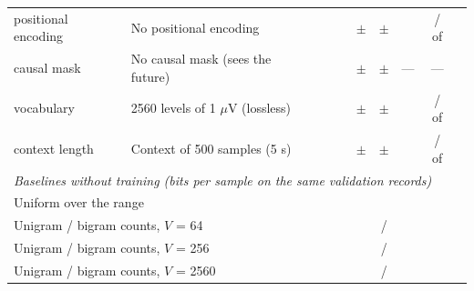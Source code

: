 \begin{tabular}{llrrrccccr}
\addlinespace
positional encoding & No positional encoding & \generativeParamsNoPos{} & \generativeContextNoPos{} & \generativeVocabNoPos{} & \generativeCeMeanNoPos{} $\pm$ \generativeCeSdNoPos{} & \generativeBitsMeanNoPos{} $\pm$ \generativeBitsSdNoPos{} & \generativeDiffMeanNoPos{} & \generativeNSeedsBetterNoPos{} / \generativeNSeedsWorseNoPos{} of \generativeNSeedsComparedNoPos{} & \generativeCeLastMeanNoPos{} \\
\addlinespace
causal mask & No causal mask (sees the future) & \generativeParamsNoMask{} & \generativeContextNoMask{} & \generativeVocabNoMask{} & \generativeCeMeanNoMask{} $\pm$ \generativeCeSdNoMask{} & \generativeBitsMeanNoMask{} $\pm$ \generativeBitsSdNoMask{} & --- & --- & \generativeCeLastMeanNoMask{} \\
\addlinespace
vocabulary & 2560 levels of 1 $\mu$V (lossless) & \generativeParamsVocabTwoFiveSixZero{} & \generativeContextVocabTwoFiveSixZero{} & \generativeVocabVocabTwoFiveSixZero{} & \generativeCeMeanVocabTwoFiveSixZero{} $\pm$ \generativeCeSdVocabTwoFiveSixZero{} & \generativeBitsMeanVocabTwoFiveSixZero{} $\pm$ \generativeBitsSdVocabTwoFiveSixZero{} & \generativeDiffMeanVocabTwoFiveSixZero{} & \generativeNSeedsBetterVocabTwoFiveSixZero{} / \generativeNSeedsWorseVocabTwoFiveSixZero{} of \generativeNSeedsComparedVocabTwoFiveSixZero{} & \generativeCeLastMeanVocabTwoFiveSixZero{} \\
\addlinespace
context length & Context of 500 samples (5 s) & \generativeParamsCtxFiveZeroZero{} & \generativeContextCtxFiveZeroZero{} & \generativeVocabCtxFiveZeroZero{} & \generativeCeMeanCtxFiveZeroZero{} $\pm$ \generativeCeSdCtxFiveZeroZero{} & \generativeBitsMeanCtxFiveZeroZero{} $\pm$ \generativeBitsSdCtxFiveZeroZero{} & \generativeDiffMeanCtxFiveZeroZero{} & \generativeNSeedsBetterCtxFiveZeroZero{} / \generativeNSeedsWorseCtxFiveZeroZero{} of \generativeNSeedsComparedCtxFiveZeroZero{} & \generativeCeLastMeanCtxFiveZeroZero{} \\
\midrule
\multicolumn{10}{l}{\emph{Baselines without training (bits per sample on the same validation records)}} \\
\multicolumn{6}{l}{Uniform over the range} & \generativeUniformBits{} & & & \\
\multicolumn{6}{l}{Unigram / bigram counts, $V$ = 64} & \generativeUnigramBitsVSixFour{} / \generativeBigramBitsVSixFour{} & & & \\
\multicolumn{6}{l}{Unigram / bigram counts, $V$ = 256} & \generativeUnigramBitsVTwoFiveSix{} / \generativeBigramBitsVTwoFiveSix{} & & & \\
\multicolumn{6}{l}{Unigram / bigram counts, $V$ = 2560} & \generativeUnigramBitsVTwoFiveSixZero{} / \generativeBigramBitsVTwoFiveSixZero{} & & & \\
\bottomrule
\end{tabular}
